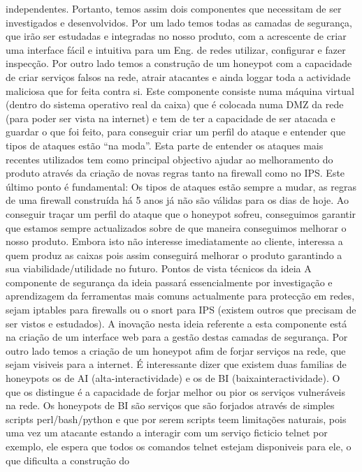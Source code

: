 independentes.
Portanto, temos assim dois componentes que necessitam de ser investigados e desenvolvidos.
Por um lado temos todas as camadas de segurança, que irão ser estudadas e integradas no nosso produto, com a
acrescente de criar uma interface fácil e intuitiva para um Eng. de redes utilizar, configurar e fazer inspecção.
Por outro lado temos a construção de um honeypot com a capacidade de criar serviços falsos na rede, atrair
atacantes e ainda loggar toda a actividade maliciosa que for feita contra si. Este componente consiste numa
máquina virtual (dentro do sistema operativo real da caixa) que é colocada numa DMZ da rede (para poder ser
vista na internet) e tem de ter a capacidade de ser atacada e guardar o que foi feito, para conseguir criar um perfil
do ataque e entender que tipos de ataques estão “na moda”.
Esta parte de entender os ataques mais recentes utilizados tem como principal objectivo ajudar ao melhoramento
do produto através da criação de novas regras tanto na firewall como no IPS.
Este último ponto é fundamental: Os tipos de ataques estão sempre a mudar, as regras de uma firewall construída
há 5 anos já não são válidas para os dias de hoje. Ao conseguir traçar um perfil do ataque que o honeypot sofreu,
conseguimos garantir que estamos sempre actualizados sobre de que maneira conseguimos melhorar o nosso
produto.
Embora isto não interesse imediatamente ao cliente, interessa a quem produz as caixas pois assim conseguirá
melhorar o produto garantindo a sua viabilidade/utilidade no futuro.
Pontos de vista técnicos da ideia
A componente de segurança da ideia passará essencialmente por investigação e aprendizagem da ferramentas mais
comuns actualmente para protecção em redes, sejam iptables para firewalls ou o snort para IPS (existem outros que
precisam de ser vistos e estudados).
A inovação nesta ideia referente a esta componente está na criação de um interface web para a gestão destas
camadas de segurança.
Por outro lado temos a criação de um honeypot afim de forjar serviços na rede, que sejam visiveis para a internet.
É interessante dizer que existem duas familias de honeypots os de AI (alta-interactividade) e os de BI (baixainteractividade).
O que os distingue é a capacidade de forjar melhor ou pior os serviços vulneráveis na rede.
Os honeypots de BI são serviços que são forjados através de simples scripts perl/bash/python e que por serem
scripts teem limitações naturais, pois uma vez um atacante estando a interagir com um serviço ficticio telnet por
exemplo, ele espera que todos os comandos telnet estejam disponiveis para ele, o que dificulta a construção do
